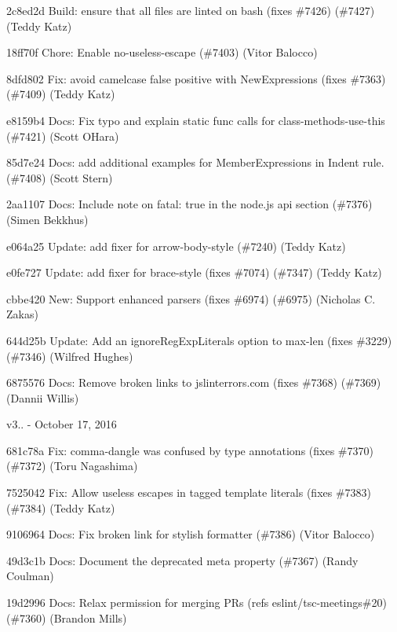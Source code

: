 \begin{DoxyItemize}
\item 2c8ed2d Build\+: ensure that all files are linted on bash (fixes \#7426) (\#7427) (Teddy Katz)
\item 18ff70f Chore\+: Enable {\ttfamily no-\/useless-\/escape} (\#7403) (Vitor Balocco)
\item 8dfd802 Fix\+: avoid {\ttfamily camelcase} false positive with New\+Expressions (fixes \#7363) (\#7409) (Teddy Katz)
\item e8159b4 Docs\+: Fix typo and explain static func calls for class-\/methods-\/use-\/this (\#7421) (Scott O\textquotesingle{}Hara)
\item 85d7e24 Docs\+: add additional examples for Member\+Expressions in Indent rule. (\#7408) (Scott Stern)
\item 2aa1107 Docs\+: Include note on fatal\+: true in the node.\+js api section (\#7376) (Simen Bekkhus)
\item e064a25 Update\+: add fixer for {\ttfamily arrow-\/body-\/style} (\#7240) (Teddy Katz)
\item e0fe727 Update\+: add fixer for {\ttfamily brace-\/style} (fixes \#7074) (\#7347) (Teddy Katz)
\item cbbe420 New\+: Support enhanced parsers (fixes \#6974) (\#6975) (Nicholas C. Zakas)
\item 644d25b Update\+: Add an ignore\+Reg\+Exp\+Literals option to max-\/len (fixes \#3229) (\#7346) (Wilfred Hughes)
\item 6875576 Docs\+: Remove broken links to jslinterrors.\+com (fixes \#7368) (\#7369) (Dannii Willis)
\end{DoxyItemize}

v3.. -\/ October 17, 2016


\begin{DoxyItemize}
\item 681c78a Fix\+: {\ttfamily comma-\/dangle} was confused by type annotations (fixes \#7370) (\#7372) (Toru Nagashima)
\item 7525042 Fix\+: Allow useless escapes in tagged template literals (fixes \#7383) (\#7384) (Teddy Katz)
\item 9106964 Docs\+: Fix broken link for stylish formatter (\#7386) (Vitor Balocco)
\item 49d3c1b Docs\+: Document the deprecated meta property (\#7367) (Randy Coulman)
\item 19d2996 Docs\+: Relax permission for merging P\+Rs (refs eslint/tsc-\/meetings\#20) (\#7360) (Brandon Mills)
\end{DoxyItemize}

